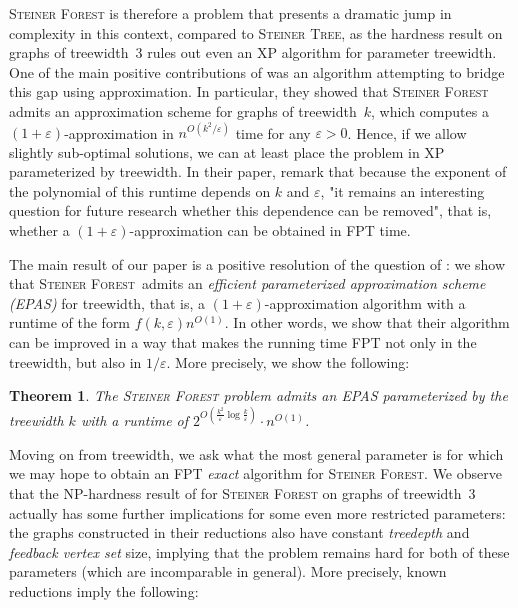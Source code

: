 \documentclass[a4paper]{article}
\let\oldcitet\citet
\renewcommand{\citet}[1]{\mbox{\oldcitet{#1}}}
\theoremstyle{plain}
\newtheorem{theorem}{Theorem}%
\newcommand{\eps}{{\varepsilon}}
\newcommand{\hy}{\hbox{-}\nobreak\hskip0pt}
\newcommand{\pname}[1]{\textsc{#1}}
\newcommand{\SF}{\pname{Steiner Forest}\xspace}
\newcommand{\ST}{\pname{Steiner Tree}\xspace}
\begin{document}
\SF is therefore a problem that presents a dramatic jump in complexity in this
context, compared to \ST, as the hardness result on graphs of treewidth~$3$
rules out even an XP algorithm for parameter treewidth. One of the main
positive contributions of \citet{bateni2011approximation} was an algorithm
attempting to bridge this gap using approximation. In particular, they showed
that \SF admits an approximation scheme for graphs of treewidth~$k$, which
computes a $(1+\eps)$\hy{}approximation in $n^{O(k^2/\eps)}$ time for any $\eps>0$. Hence, if we
allow slightly sub-optimal solutions, we can at least place the problem in XP
parameterized by treewidth. In their paper, \citet{bateni2011approximation}
remark that because the exponent of the polynomial of this runtime depends on
$k$ and $\eps$, "it remains an interesting question for future research whether
this dependence can be removed", that is, whether a $(1+\eps)$-approximation
can be obtained in FPT time.

The main result of our paper is a positive resolution of the question of
\citet{bateni2011approximation}: we show that \SF\ admits an \emph{efficient
parameterized approximation scheme (EPAS)} for treewidth, that is, a
$(1+\eps)$-approximation algorithm with a runtime of the form
$f(k,\eps)n^{O(1)}$. In other words, we show that their algorithm can be
improved in a way that makes the running time FPT not only in the treewidth,
but also in $1/\eps$. More precisely, we show the following:




\begin{theorem}\label{thm:tw-EPAS}
The \SF problem admits an EPAS parameterized by the treewidth $k$ with a runtime of $2^{O(\frac{k^2}{\eps}\log\frac{k}{\eps})}\cdot n^{O(1)}$.
\end{theorem}



%

Moving on from treewidth, we ask what the most general
parameter is for which we may hope to obtain an FPT \emph{exact} algorithm for
\SF. We observe that the NP-hardness result of \citet{gassner2010steiner,
bateni2011approximation} for \SF on graphs of treewidth~$3$ actually has some
further implications for some even more restricted parameters: the graphs
constructed in their reductions also have constant \emph{treedepth} and
\emph{feedback vertex set} size, implying that the problem remains hard for
both of these parameters (which are incomparable in general). More
precisely, known reductions imply the following:
\end{document}
